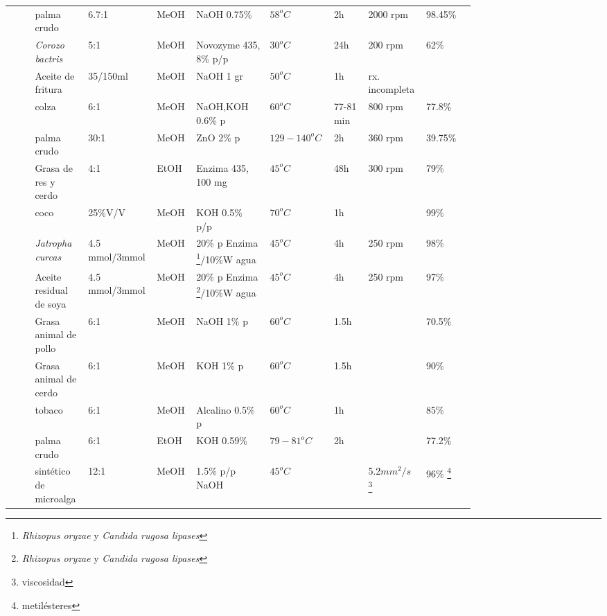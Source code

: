 \begin{longtable}{p{0.05\linewidth}  p{0.1\linewidth} p{0.07\linewidth}  p{0.07\linewidth} p{0.15\linewidth}  p{0.1\linewidth} p{0.07\linewidth}  p{0.07\linewidth} p{0.1\linewidth}}
	\cite{OrtizTapia2016} & palma crudo & 6.7:1 & MeOH & NaOH 0.75\% & $58^oC$ & 2h & 2000 rpm & 98.45\% \\
	\cite{PoloRodriguezLauraFontalvoGomezMiriam2017}& \emph{Corozo bactris}& 5:1 & MeOH & Novozyme 435, 8\% p/p & $30^oC$ & 24h & 200 rpm & 62\%\\
	\cite{RAMIREZ-COUTINOVictorAngelCASTANEDA-MARTINEZEmorySALDANA-LOPEZGerardoGONZALEZ-LOPEZ2017}& Aceite de fritura &35/150ml & MeOH & NaOH 1 gr & $50^oC$ & 1h & rx. incompleta & \\
	\cite{MedinaRamirezE.2012}& colza & 6:1 & MeOH & NaOH,KOH 0.6\% p & $60^oC$ & 77-81 min & 800 rpm & 77.8\% \\
	\cite{RiverosSantamariaLinaMarcelaMolano2006} & palma crudo & 30:1 & MeOH & ZnO 2\% p & $129-140^oC$ & 2h & 360 rpm & 39.75\%\\
	\cite{RiveraIvannaVillanuevaGerardo2009}& Grasa de res y cerdo & 4:1 & EtOH & Enzima 435, 100 mg & $45^oC$ & 48h & 300 rpm & 79\% \\
	\cite{RUIZ-ARCOSJoseSANDOVAL-SALASFabiolaDELANGELRAMOS2016}& coco & 25\%V/V & MeOH & KOH 0.5\% p/p & $70^oC$ & 1h & & 99\% \\
	\cite{Tamalampudi2008} & \emph{Jatropha curcas}& 4.5 mmol/3mmol & MeOH & 20\% p Enzima \footnote{\emph{Rhizopus oryzae} y \emph{Candida rugosa lipases}}/10\%W agua & $45^oC$ & 4h & 250 rpm & 98\% \\
	\cite{Tamalampudi2008}& Aceite residual de soya & 4.5 mmol/3mmol & MeOH & 20\% p Enzima \footnote{\emph{Rhizopus oryzae} y \emph{Candida rugosa lipases}}/10\%W agua & $45^oC$ & 4h & 250 rpm & 97\% \\
	\cite{TejedaTovarCandelariaTejedaBenitezLeslyVillabonaOrtizAngel2013} & Grasa animal de pollo & 6:1 & MeOH & NaOH 1\% p & $60^oC$ &  1.5h & & 70.5\% \\
	\cite{TejedaTovarCandelariaTejedaBenitezLeslyVillabonaOrtizAngel2013}& Grasa animal de cerdo & 6:1 & MeOH & KOH 1\% p & $60^oC$ & 1.5h & & 90\% \\
	\cite{Veljkovic2006} & tobaco & 6:1 & MeOH & Alcalino 0.5\% p & $60^oC$ & 1h & & 85\% \\
	\cite{Zuleta2008}& palma crudo & 6:1 & EtOH & KOH 0.59\%  & $79-81^oC$ & 2h & & 77.2\%\\
	\cite{Barajas2011}& sintético de microalga & 12:1 & MeOH & 1.5\% p/p NaOH & $45^oC$ & & 5.2$mm^2/s$ \footnote{viscosidad} & 96\% \footnote{metilésteres}\\
\end{longtable}

